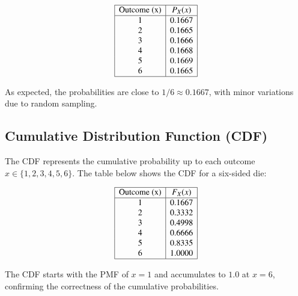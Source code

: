 \documentclass[journal]{IEEEtran}
\begin{document}
\[
\begin{array}{|c|c|}
\hline
\text{Outcome (x)} & P_X(x) \\
\hline
1 & 0.1667 \\
2 & 0.1665 \\
3 & 0.1666 \\
4 & 0.1668 \\
5 & 0.1669 \\
6 & 0.1665 \\
\hline
\end{array}
\]

As expected, the probabilities are close to \(1/6 \approx 0.1667\), with minor variations due to random sampling.

\subsection*{Cumulative Distribution Function (CDF)}
The CDF represents the cumulative probability up to each outcome \(x \in \{1, 2, 3, 4, 5, 6\}\). The table below shows the CDF for a six-sided die:

\[
\begin{array}{|c|c|}
\hline
\text{Outcome (x)} & F_X(x) \\
\hline
1 & 0.1667 \\
2 & 0.3332 \\
3 & 0.4998 \\
4 & 0.6666 \\
5 & 0.8335 \\
6 & 1.0000 \\
\hline
\end{array}
\]

The CDF starts with the PMF of \(x = 1\) and accumulates to \(1.0\) at \(x = 6\), confirming the correctness of the cumulative probabilities.
\end{document}
